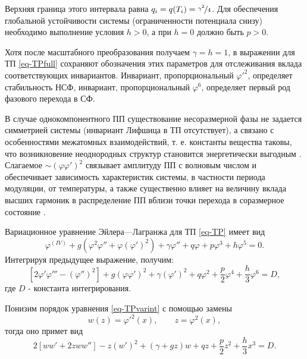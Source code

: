 Верхняя граница этого интервала равна \cite{Ishibashi1978} $q_i = q(T_i) = \nicefrac{\gamma^2}{4}$.
Для обеспечения глобальной устойчивости системы (ограниченности потенциала снизу) необходимо выполнение условия $h>0$, а при $h=0$ должно быть $p>0$.

Хотя после масштабного преобразования получаем $\gamma=h=1$, в выражении для ТП \eqref{eq-TPfull} сохраняют обозначения этих параметров для отслеживания вклада соответствующих инвариантов.
Инвариант, пропорциональный $\varphi'^2$, определяет стабильность НСФ, инвариант, пропорциональный $\varphi^6$, определяет первый род фазового перехода в СФ.

В случае однокомпонентного ПП существование несоразмерной фазы не задается симметрией системы (инвариант Лифшица в ТП отсутствует), а связано с особенностями  межатомных взаимодействий, т. е. константы вещества таковы, что возникновение неоднородных структур становится энергетически выгодным \cite{Klepikov1996}.
Слагаемое $\sim\left(\varphi\varphi'\right)^2$ связывает амплитуду ПП с волновым числом и обеспечивает зависимость характеристик системы, в частности периода модуляции, от температуры, а также существенно влияет на величину вклада высших гармоник в распределение ПП вблизи точки перехода в соразмерное состояние \cite{Berezovsky1998, Berezovsky1998ua}.

Вариационное уравнение Эйлера—Лагранжа для ТП \eqref{eq-TP} имеет вид
\begin{equation}
\varphi^{(IV)} + 
g\left(\varphi^2\varphi'' + \varphi\left(\varphi'\right)^2\right) +
\gamma\varphi'' + q\varphi + p\varphi^3 + h\varphi^5 = 0.
\label{eq-TPvar}
\end{equation}
Интегрируя предыдущее выражение, получим:
\begin{equation}
\left[2\varphi'\varphi''' - \left(\varphi''\right)^2\right] +
g\left(\varphi\varphi'\right)^2 + \gamma\left(\varphi'\right)^2 +
q\varphi^2 +\frac{p}{2}\varphi^4 + \frac{h}{3}\varphi^6 = D,
\label{eq-TPvarint}
\end{equation}
где $D$ - константа интегрирования.

Понизим порядок уравнения \eqref{eq-TPvarint} с помощью замены
\begin{equation}
w(z) = \varphi'^2(x), \qquad z = \varphi^2(x),
\label{eq-wsubst}
\end{equation}
тогда оно примет вид
\begin{equation}
2\left[ww' + 2zww''\right] - z\left(w'\right)^2 + (\gamma+gz)w +
qz +\frac{p}{2}z^2 + \frac{h}{3}x^3 = D.
\label{eq-varwsubst}
\end{equation}

